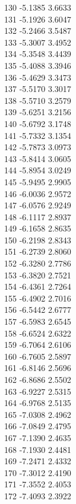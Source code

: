 \documentclass[11pt]{article}
\theoremstyle{definition}
\theoremstyle{plain}
\begin{document}
{130 -5.1385 3.6633\\
131 -5.1926 3.6047\\
132 -5.2466 3.5487\\
133 -5.3007 3.4952\\
134 -5.3548 3.4439\\
135 -5.4088 3.3946\\
136 -5.4629 3.3473\\
137 -5.5170 3.3017\\
138 -5.5710 3.2579\\
139 -5.6251 3.2156\\
140 -5.6792 3.1748\\
141 -5.7332 3.1354\\
142 -5.7873 3.0973\\
143 -5.8414 3.0605\\
144 -5.8954 3.0249\\
145 -5.9495 2.9905\\
146 -6.0036 2.9572\\
147 -6.0576 2.9249\\
148 -6.1117 2.8937\\
149 -6.1658 2.8635\\
150 -6.2198 2.8343\\
151 -6.2739 2.8060\\
152 -6.3280 2.7786\\
153 -6.3820 2.7521\\
154 -6.4361 2.7264\\
155 -6.4902 2.7016\\
156 -6.5442 2.6777\\
157 -6.5983 2.6545\\
158 -6.6524 2.6322\\
159 -6.7064 2.6106\\
160 -6.7605 2.5897\\
161 -6.8146 2.5696\\
162 -6.8686 2.5502\\
163 -6.9227 2.5315\\
164 -6.9768 2.5135\\
165 -7.0308 2.4962\\
166 -7.0849 2.4795\\
167 -7.1390 2.4635\\
168 -7.1930 2.4481\\
169 -7.2471 2.4332\\
170 -7.3012 2.4190\\
171 -7.3552 2.4053\\
172 -7.4093 2.3922\\
}
\end{document}
